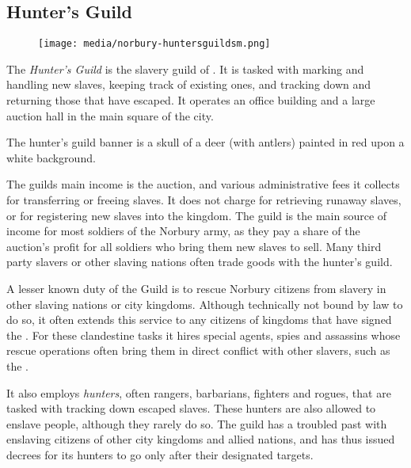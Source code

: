 \subsection{Hunter's Guild}
\label{sec:Hunters Guild}

\begin{figure}[!ht]
  \centering
  \texttt{[image: media/norbury-huntersguildsm.png]}
\end{figure}

The \emph{Hunter's Guild} is the slavery guild of . It is
tasked with marking and handling new slaves, keeping track of existing ones,
and tracking down and returning those that have escaped. It operates an office
building and a large auction hall in the main square of the city.

The hunter's guild banner is a skull of a deer (with antlers) painted in red
upon a white background.

The guilds main income is the auction, and various administrative fees it
collects for transferring or freeing slaves. It does not charge for retrieving
runaway slaves, or for registering new slaves into the kingdom. The guild is
the main source of income for most soldiers of the Norbury army, as they pay a
share of the auction's profit for all soldiers who bring them new slaves to
sell. Many third party slavers or other slaving nations often trade goods with
the hunter's guild.

A lesser known duty of the Guild is to rescue Norbury citizens from slavery in
other slaving nations or city kingdoms. Although technically not bound by law
to do so, it often extends this service to any citizens of kingdoms that have
signed the . For these clandestine tasks it hires
special agents, spies and assassins whose rescue operations often bring them
in direct conflict with other slavers, such as the .

It also employs \emph{hunters}, often rangers, barbarians, fighters and
rogues, that are tasked with tracking down escaped slaves. These hunters are
also allowed to enslave people, although they rarely do so. The guild
has a troubled past with enslaving citizens of other city kingdoms and allied
nations, and has thus issued decrees for its hunters to go only after their
designated targets.

